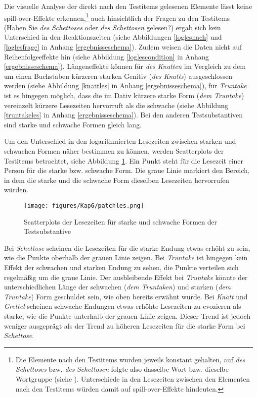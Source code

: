  
Die visuelle Analyse der direkt nach den Testitems gelesenen Elemente lässt keine spill-over-Effekte erkennen,\footnote{Die Elemente nach den Testitems wurden jeweils konstant gehalten, auf \textit{des Schettoses} bzw. \textit{des Schettosen} folgte also dasselbe Wort bzw. dieselbe Wortgruppe (siehe ). Unterschiede in den Lesezeiten zwischen den Elementen nach den Testitems würden damit auf spill-over-Effekte hindeuten.} auch hinsichtlich der Fragen zu den Test\-items (Haben Sie \textit{des Schettoses} oder \textit{des Schettosen} gelesen?) ergab sich kein Unterschied in den Reaktionszeiten (siehe Abbildungen \ref{loglesnach} und \ref{loglesfrage} in Anhang \ref{ergebnisseschema}). Zudem weisen die Daten nicht auf Reihenfolgeeffekte hin (siehe Abbildung \ref{loglescondition} in Anhang \ref{ergebnisseschema}). Längeneffekte können für \textit{des Knatten} im Vergleich zu dem um einen Buchstaben kürzeren starken Genitiv  (\textit{des Knatts}) ausgeschlossen werden (siehe Abbildung \ref{knattles} in Anhang \ref{ergebnisseschema}), für \textit{Truntake} ist es hingegen möglich, dass die im Dativ kürzere starke Form (\textit{dem Truntake}) vereinzelt kürzere Lesezeiten hervorruft als die schwache (siehe Abbildung \ref{truntakeles} in Anhang \ref{ergebnisseschema}). Bei den anderen Testsubstantiven sind starke und schwache Formen gleich lang.\largerpage[-2]

Um den Unterschied in den logarithmierten Lesezeiten zwischen starken und schwachen Formen näher bestimmen zu können, werden Scatterplots der Test\-items betrachtet, siehe  Abbildung \ref{scatterleslogRT}. Ein Punkt steht für die Lesezeit einer Person für die starke bzw. schwache Form. Die graue Linie markiert den Bereich, in dem die starke und die schwache Form dieselben Lesezeiten hervorrufen würden.

\begin{figure}
\texttt{[image: figures/Kap6/patchles.png]} 
\caption{Scatterplots der Lesezeiten für starke und schwache Formen der Testsubstantive}
\label{scatterleslogRT}
\end{figure}

Bei \textit{Schettose} scheinen die Lesezeiten für die starke Endung etwas erhöht zu sein, wie die Punkte oberhalb der grauen Linie zeigen. Bei \textit{Truntake} ist hingegen kein Effekt der schwachen und starken Endung zu sehen, die Punkte verteilen sich regelmäßig um die graue Linie. Der ausbleibende Effekt bei \textit{Truntake} könnte der unterschiedlichen Länge der schwachen (\textit{dem Truntaken}) und starken (\textit{dem Truntake}) Form geschuldet sein, wie oben bereits erwähnt wurde.  Bei \textit{Knatt} und \textit{Grettel} scheinen schwache Endungen etwas erhöhte Lesezeiten zu evozieren als starke, wie die Punkte unterhalb der grauen Linie zeigen. Dieser Trend ist jedoch weniger ausgeprägt als der Trend zu höheren Lesezeiten für die starke Form bei \textit{Schettose}. 

